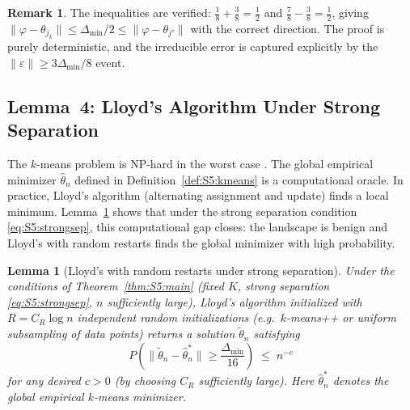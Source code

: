 \documentclass[twoside]{article}
\theoremstyle{plain}
\newtheorem{lemma}[theorem]{Lemma}
\theoremstyle{definition}
\newtheorem{remark}[theorem]{Remark}
\theoremstyle{remark}
\newcommand{\1}{\mathbf{1}}
\renewcommand{\phi}{\varphi}
\newcommand{\htheta}{\hat{\theta}}
\newcommand{\ttheta}{\tilde{\theta}}
\newcommand{\norm}[1]{\lVert#1\rVert}
\begin{document}
\begin{remark}
The inequalities are verified:
$\frac18+\frac38=\frac12$ and $\frac78-\frac38=\frac12$, giving
$\norm{\phi-\theta_{j_k}}\le\Delta_{\min}/2\le\norm{\phi-\theta_{j'}}$
with the correct direction.  The proof is purely deterministic, and the
irreducible error is captured explicitly by the
$\norm{\varepsilon}\ge3\Delta_{\min}/8$ event.
\end{remark}

\subsection{Lemma~4: Lloyd's Algorithm Under Strong Separation}
\label{sec:S5:lem4}

The $k$-means problem is NP-hard in the worst case
\cite{aloise2009np,dasgupta2008hardness}.  The global empirical minimizer
$\htheta_n$ defined in Definition~\ref{def:S5:kmeans} is a computational
oracle.  In practice, Lloyd's algorithm (alternating assignment and update)
finds a local minimum.  Lemma~\ref{lem:S5:lloyd} shows that under the
strong separation condition \eqref{eq:S5:strongsep}, this computational gap
closes: the landscape is benign and Lloyd's with random restarts finds the
global minimizer with high probability.

\begin{lemma}[Lloyd's with random restarts under strong separation]
\label{lem:S5:lloyd}
Under the conditions of Theorem~\ref{thm:S5:main} (fixed $K$, strong
separation \eqref{eq:S5:strongsep}, $n$ sufficiently large), Lloyd's
algorithm initialized with $R=C_R\log n$ independent random initializations
(e.g.\ $k$-means++ or uniform subsampling of data points) returns a
solution $\ttheta_n$ satisfying
\[
P\!\left(\norm{\ttheta_n-\htheta_n^*}\ge\frac{\Delta_{\min}}{16}\right)
\;\le\; n^{-c}
\]
for any desired $c>0$ (by choosing $C_R$ sufficiently large).  Here
$\htheta_n^*$ denotes the global empirical $k$-means minimizer.
\end{lemma}
\end{document}
